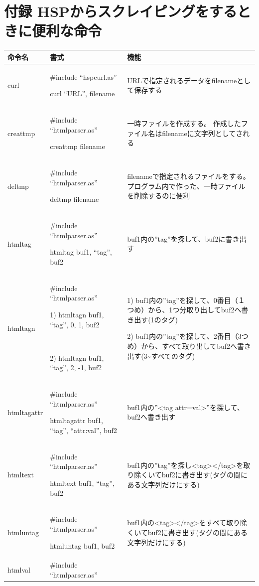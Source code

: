 \documentclass[a4paper,12pt,dvipdfmx]{jarticle}
\begin{document}
\bigskip

\clearpage\section{付録
HSPからスクレイピングをするときに便利な命令}
\begin{center}
\tablefirsthead{}
\tablehead{}
\tabletail{}
\tablelasttail{}
\begin{supertabular}{|m{2.349cm}|m{7.57cm}|m{6.487cm}|}
\hline
命令名 &
書式 &
機能\\\hline
curl &
\#include “hspcurl.as”

curl “URL”, filename &
URLで指定されるデータをfilenameとして保存する\\\hline
creattmp &
\#include “htmlparser.as”

creattmp filename &
一時ファイルを作成する。
	作成したファイル名はfilenameに文字列としてされる\\\hline
deltmp &
\#include “htmlparser.as”

deltmp filename &
filenameで指定されるファイルをする。
	プログラム内で作った、一時ファイルを削除するのに便利\\\hline
htmltag &
\#include “htmlparser.as”

htmltag buf1, “tag”, buf2 &
buf1内の”tag”を探して、buf2に書き出す\\\hline
htmltagn &
\#include “htmlparser.as”

1) htmltagn buf1, “tag”, 0, 1, buf2

~

2) htmltagn buf1, “tag”, 2, -1, buf2 &
1)
buf1内の”tag”を探して、0番目（１つめ）から、1つ分取り出してbuf2へ書き出す(1のタグ)

2)
buf1内の”tag”を探して、2番目（3つめ）から、すべて取り出してbuf2へ書き出す(3{\textasciitilde}すべてのタグ)\\\hline
htmltagattr &
\#include “htmlparser.as”

htmltagattr buf1, “tag”, “attr:val”, buf2 &
buf1内の”{\textless}tag
attr=val{\textgreater}”を探して、buf2へ書き出す\\\hline
htmltext &
\#include “htmlparser.as”

htmltext buf1, “tag”, buf2 &
buf1内の”tag”を探し{\textless}tag{\textgreater}{\textless}/tag{\textgreater}を取り除くいてbuf2に書き出す(タグの間にある文字列だけにする)\\\hline
htmluntag &
\#include “htmlparser.as”

htmluntag buf1, buf2 &
buf1内の{\textless}tag{\textgreater}{\textless}/tag{\textgreater}をすべて取り除くいてbuf2に書き出す(タグの間にある文字列だけにする)\\\hline
htmlval &
\#include “htmlparser.as”


\end{supertabular}
\end{center}
\end{document}
